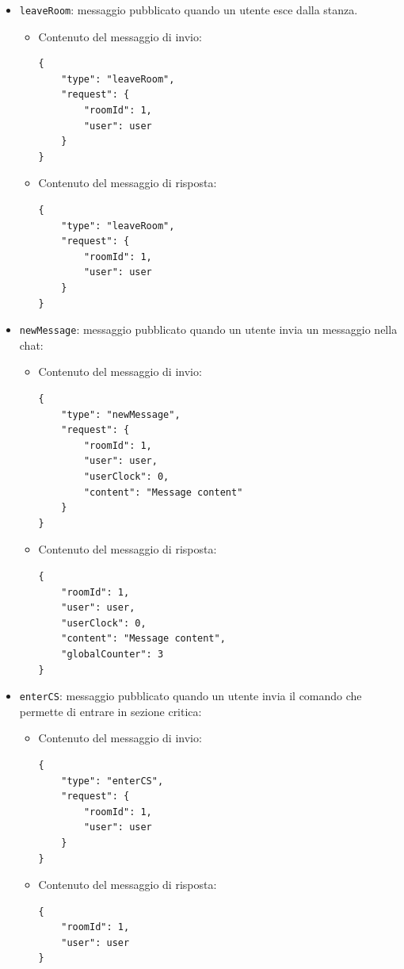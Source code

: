 \documentclass[a4paper]{article}
\begin{document}
\begin{itemize}
    \item \texttt{leaveRoom}: messaggio pubblicato quando un utente esce dalla stanza.
        \begin{itemize}
            \item Contenuto del messaggio di invio:
            \begin{verbatim}
{
    "type": "leaveRoom",
    "request": {
        "roomId": 1,
        "user": user
    } 
}
            \end{verbatim}
            \item Contenuto del messaggio di risposta:
            \begin{verbatim}
{
    "type": "leaveRoom",
    "request": {
        "roomId": 1,
        "user": user
    }
}
            \end{verbatim}
        \end{itemize}       

    \item \texttt{newMessage}: messaggio pubblicato quando un utente invia un messaggio nella chat:
       \begin{itemize}
            \item Contenuto del messaggio di invio:
            \begin{verbatim}
{
    "type": "newMessage",
    "request": {
        "roomId": 1,
        "user": user,
        "userClock": 0,
        "content": "Message content"
    } 
}
            \end{verbatim}
            \item Contenuto del messaggio di risposta:
            \begin{verbatim}
{
    "roomId": 1,
    "user": user,
    "userClock": 0,
    "content": "Message content",
    "globalCounter": 3
}
            \end{verbatim}
        \end{itemize}

    \item \texttt{enterCS}: messaggio pubblicato quando un utente invia il comando che permette di entrare in sezione critica:
       \begin{itemize}
            \item Contenuto del messaggio di invio:
            \begin{verbatim}
{
    "type": "enterCS",
    "request": {
        "roomId": 1,
        "user": user
    } 
}
            \end{verbatim}
            \item Contenuto del messaggio di risposta:
            \newpage
            \begin{verbatim}
{
    "roomId": 1,
    "user": user
}
            \end{verbatim}
        \end{itemize}


\end{itemize}
\end{document}
